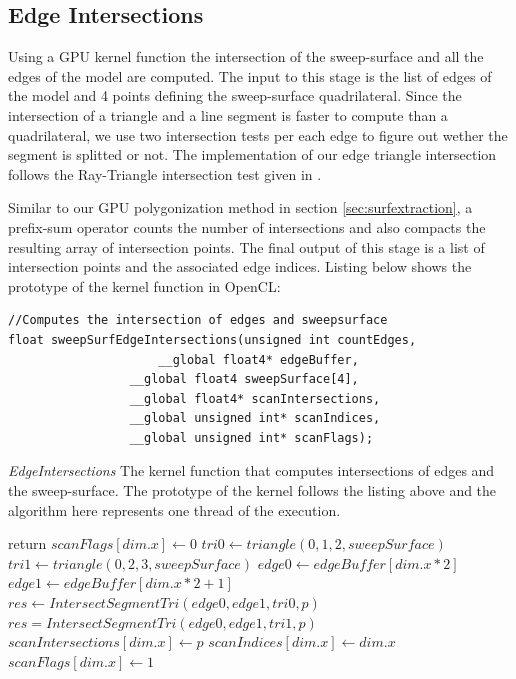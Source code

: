 \subsection{Edge Intersections}
Using a GPU kernel function the intersection of the sweep-surface and all the edges of the model are computed. 
The input to this stage is the list of edges of the model and 4 points defining the sweep-surface quadrilateral. 
Since the intersection of a triangle and a line segment is faster to compute than a quadrilateral, we 
use two intersection tests per each edge to figure out wether the segment is splitted or not. The implementation
of our edge triangle intersection follows the Ray-Triangle intersection test given in \cite{RTR3}.


Similar to our GPU polygonization method in section \ref{sec:surfextraction}, a prefix-sum operator counts the number
of intersections and also compacts the resulting array of intersection points. The final output of this stage is a list
of intersection points and the associated edge indices. Listing below shows the prototype of the kernel function in 
OpenCL:

\begin{lstlisting}[frame=single]
//Computes the intersection of edges and sweepsurface
float sweepSurfEdgeIntersections(unsigned int countEdges,
			         __global float4* edgeBuffer,
				 __global float4 sweepSurface[4],
				 __global float4* scanIntersections,
				 __global unsigned int* scanIndices,
				 __global unsigned int* scanFlags);
\end{lstlisting}
		     
\begin{algorithm}[H]
\caption{\textit{EdgeIntersections} The kernel function that computes intersections of edges 
and the sweep-surface. The prototype of the kernel follows the listing above and the algorithm here represents one 
thread of the execution. }
\label{alg:edgeIntersections}
\begin{algorithmic}[1]	
  \STATE return
  \ENDIF
  \STATE $scanFlags[dim.x] \gets 0$
  \STATE $tri0 \gets triangle(0, 1, 2, sweepSurface)$
  \STATE $tri1 \gets triangle(0, 2, 3, sweepSurface)$
  \STATE $edge0 \gets edgeBuffer[dim.x * 2]$
  \STATE $edge1 \gets edgeBuffer[dim.x * 2 + 1]$
  \STATE $res \gets IntersectSegmentTri(edge0, edge1, tri0, p)$
  \STATE $res = IntersectSegmentTri(edge0, edge1, tri1, p)$
  \ENDIF
  \STATE $scanIntersections[dim.x] \gets p$
  \STATE $scanIndices[dim.x] \gets dim.x$
  \STATE $scanFlags[dim.x] \gets 1$
  \ENDIF
  
\end{algorithmic}
\end{algorithm}



